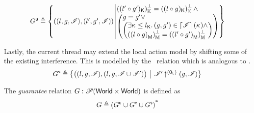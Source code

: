 \[
	\updateG \eqdef
 	\left\{
	\begin{array}{@{} l @{\hspace*{2pt}} | @{\hspace*{2pt}} r @{}}
	  \left(
	     	(l, g, \lmod),
	     	(l', g', \lmod)
		\right)
  	&
  	\begin{array}{@{} l @{} }
  		\ortCap{\capPart{(l' \composeL g')}}  = \ortCap{\capPart{(l \composeL g)}} \land\\
	  	\left(
	  	\begin{array}{@{} l @{} }
	 		g = g' \lor\\
	 	  	\left(
	 	  	\begin{array}{@{} l @{}}
	 	  		\exsts{\ca{} \leq \capPart{l}}
	 	  		(g, g') \in \padAM{\lmod}(\ca{}) \land\\
	 	  	
	 	  	\ortH{\heapPart{\left(l \composeL g\right)}} = 
	 	  	\ortH{\heapPart{\left(l' \composeL g'\right)}}
	 	  	\end{array}	
	 	  	\right)
	 	\end{array}
   		\right)
   		\end{array}
 	\end{array}
	\right\}
\]
%
%

Lastly, the current thread may extend the local action model by shifting some of the existing interference. This is modelled by the \shiftG\ relation which is analogous to \shiftR.
%
\[
\shiftG \eqdef
\left\{
\begin{array}{@{} l @{\hspace*{5pt}} | @{\hspace*{5pt}} r @{}}
  \left(
  \begin{array}{@{} l @{}}
    (l, g, \lmod),
    \left( l, g, \lmod \cup \lmod'  \right)
  \end{array}
  \right)
  &
  \expandsAM{\lmod'}{\unitL}{g}{\lmod}
\end{array}
\right\}
\]

\begin{definition}[Guarantee]
The \emph{guarantee} relation $G: \mathscr{P} (\mathsf{World} \times \mathsf{World})$ is defined as
\[
G \triangleq  \left( G^{\textsf{u}} \cup G^{\textsf{e}} \cup G^{\textsf{s}} \right)^{\text{*}}
\]
\end{definition}

